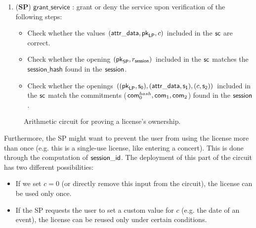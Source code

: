 \begin{enumerate}
	\item (\textbf{SP}) $\mathsf{grant\_service}$ : grant or deny the service upon verification of the following steps:

	\begin{itemize}
		\item Check whether the values $(\mathsf{attr\_data}, \mathsf{pk}_{\mathsf{LP}}, c)$ included in the $\mathsf{sc}$ are correct.
		\item Check whether the opening $(\mathsf{pk}_{\mathsf{SP}}, r_\mathsf{session})$ included in the $\mathsf{sc}$ matches the $\mathsf{session\_hash}$ found in the $\mathsf{session}$.
		\item Check whether the openings $((\mathsf{pk}_{\mathsf{LP}}, \mathsf{s_0}), (\mathsf{attr\_data}, \mathsf{s_1}), (c, \mathsf{s_2}))$ included in the $\mathsf{sc}$ match the commitments ($\mathsf{com}_0^{hash}, \mathsf{com}_1, \mathsf{com}_2$) found in the $\mathsf{session}$.
	\end{itemize}

\end{enumerate}

\begin{figure}[h]
	\centering
	\setlength{\fboxsep}{5pt}%
	\setlength{\fboxrule}{0.3pt}%
	\caption{Arithmetic circuit for proving a license's ownership.}
	\label{fig:circuit_prove_nft}
\end{figure}

Furthermore, the SP might want to prevent the user from using the license more than once (e.g. this is a single-use license, like entering a concert). This is done through the computation of $\mathsf{session\_id}$. The deployment of this part of the circuit has two different possibilities:
\begin{itemize}
	\item If we set $c = 0$ (or directly remove this input from the circuit), the license can be used only once.
	\item If the SP requests the user to set a custom value for $c$ (e.g. the date of an event), the license can be reused only under certain conditions.
\end{itemize}


